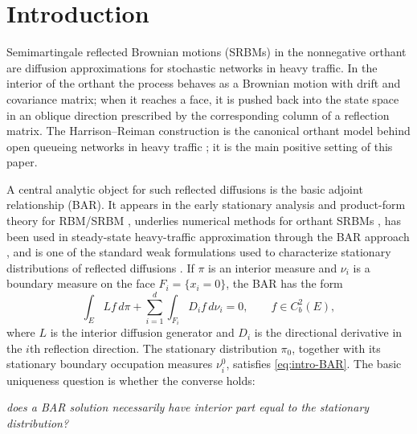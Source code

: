 \documentclass[aihp]{imsart}
\numberwithin{equation}{section}
\theoremstyle{plain}
\theoremstyle{definition}
\newcommand{\1}{\mathbf 1}
\providecommand{\kwdgroup}[2][]{#2}
\begin{document}
\begin{frontmatter}
\begin{keyword}[class=MSC]
\kwdgroup[type=primary]{}
\kwdgroup[type=secondary]{}
\end{keyword}

\begin{keyword}
\end{keyword}
\end{frontmatter}



\section{Introduction}

Semimartingale reflected Brownian motions (SRBMs) in the nonnegative orthant are diffusion approximations for stochastic networks in heavy traffic.  In the interior of the orthant the process behaves as a Brownian motion with drift and covariance matrix; when it reaches a face, it is pushed back into the state space in an oblique direction prescribed by the corresponding column of a reflection matrix.  The Harrison--Reiman construction \cite{HarrisonReiman1981,HarrisonReiman1981Distribution} is the canonical orthant model behind open queueing networks in heavy traffic \cite{Reiman1984,harrison1987brownian,HarrisonNguyen1993,Harrison1985,Williams1995}; it is the main positive setting of this paper.

A central analytic object for such reflected diffusions is the basic adjoint relationship (BAR).  It appears in the early stationary analysis and product-form theory for RBM/SRBM \cite{HarrisonReiman1981Distribution,harrison1987multidimensional,harrison1987brownian}, underlies numerical methods for orthant SRBMs \cite{DaiHarrison1991,DaiHarrison1992}, has been used in steady-state heavy-traffic approximation through the BAR approach \cite{BravermanDaiMiyazawa2017,BravermanDaiMiyazawa2025}, and is one of the standard weak formulations used to characterize stationary distributions of reflected diffusions \cite{DaiDieker2011,KangRamanan2014}. If $\pi$ is an interior measure and $\nu_i$ is a boundary measure on the face $F_i=\{x_i=0\}$, the BAR has the form
\begin{equation}\label{eq:intro-BAR}
 \int_E Lf\,d\pi+
 \sum_{i=1}^d\int_{F_i}D_i f\,d\nu_i=0,
 \qquad f\in C_b^2(E),
\end{equation}
where $L$ is the interior diffusion generator and $D_i$ is the directional derivative in the $i$th reflection direction.  The stationary distribution $\pi_0$, together with its stationary boundary occupation measures $\nu_i^0$, satisfies \eqref{eq:intro-BAR}.  The basic uniqueness question is whether the converse holds:
\begin{center}
    \emph{does a BAR solution necessarily have interior part equal to the stationary distribution? }
\end{center}
\end{document}
